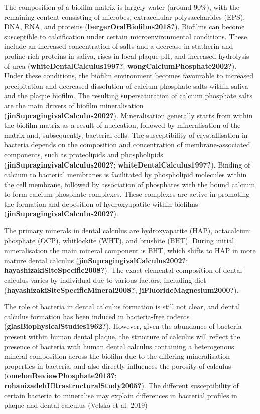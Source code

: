 \documentclass[
]{article}
\begin{document}
The composition of a biofilm matrix is largely water (around 90\%), with
the remaining content consisting of microbes, extracellular
polysaccharides (EPS), DNA, RNA, and proteins
(\textbf{bergerOralBiofilms2018?}). Biofilms can become susceptible to
calcification under certain microenvironmental conditions. These include
an increased concentration of salts and a decrease in statherin and
proline-rich proteins in saliva, rises in local plaque pH, and increased
hydrolysis of urea (\textbf{whiteDentalCalculus1997?};
\textbf{wongCalciumPhosphate2002?}). Under these conditions, the biofilm
environment becomes favourable to increased precipitation and decreased
dissolution of calcium phosphate salts within saliva and the plaque
biofilm. The resulting supersaturation of calcium phosphate salts are
the main drivers of biofilm mineralisation
(\textbf{jinSupragingivalCalculus2002?}). Mineralisation generally
starts from within the biofilm matrix as a result of nucleation,
followed by mineralisation of the matrix and, subsequently, bacterial
cells. The susceptibility of crystallisation in bacteria depends on the
composition and concentration of membrane-associated components, such as
proteolipids and phospholipids (\textbf{jinSupragingivalCalculus2002?};
\textbf{whiteDentalCalculus1997?}). Binding of calcium to bacterial
membranes is facilitated by phospholipid molecules within the cell
membrane, followed by association of phosphates with the bound calcium
to form calcium phosphate complexes. These complexes are active in
promoting the formation and deposition of hydroxyapatite within biofilms
(\textbf{jinSupragingivalCalculus2002?}).

The primary minerals in dental calculus are hydroxyapatite (HAP),
octacalcium phosphate (OCP), whitlockite (WHT), and brushite (BHT).
During initial mineralisation the main mineral component is BHT, which
shifts to HAP in more mature dental calculus
(\textbf{jinSupragingivalCalculus2002?};
\textbf{hayashizakiSiteSpecific2008?}). The exact elemental composition
of dental calculus varies by individual due to various factors,
including diet (\textbf{hayashizakiSiteSpecificMineral2008?};
\textbf{jiFluorideMagnesium2000?}).

The role of bacteria in dental calculus formation is still not clear,
and dental calculus formation has been induced in bacteria-free rodents
(\textbf{glasBiophysicalStudies1962?}). However, given the abundance of
bacteria present within human dental plaque, the structure of calculus
will reflect the presence of bacteria with human dental calculus
containing a heterogenous mineral composition across the biofilm due to
the differing mineralisation properties in bacteria, and also directly
influences the porosity of calculus
(\textbf{omelonReviewPhosphate2013?};
\textbf{rohanizadehUltrastructuralStudy2005?}). The different
susceptibility of certain bacteria to mineralise may explain differences
in bacterial profiles in plaque and dental calculus (Velsko et al. 2019)
\end{document}
